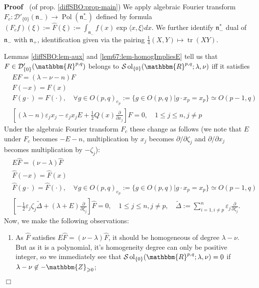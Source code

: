 \documentclass{article}
\newcommand{\assign}{:=}
\newcommand{\nin}{\not\in}
\newcommand{\nocomma}{}
\newcommand{\tmop}[1]{\ensuremath{\operatorname{#1}}}
\renewenvironment{proof}{\noindent\textbf{Proof\ }}{\hspace*{\fill}$\Box$\medskip}
\theoremstyle{remark}
\begin{document}
\begin{proof}
  (of prop. \ref{diffSBO:prop-main}) We apply algebraic Fourier transform $F_c
  : \mathcal{D}'_{\{ 0 \}} (\mathfrak{n}_-) \rightarrow \tmop{Pol}
  (\mathfrak{n}_-^{\ast})^{}$ defined by formula $(F_c f) (\xi) \assign
  \hat{F} (\xi) \assign \int_{\mathfrak{n}_-}^{} f (x) \exp \langle x, \xi
  \rangle d x$. We further identify $\mathfrak{n}_-^{\ast}$ dual of
  $\mathfrak{n}_-$ with $\mathfrak{n}_+$, identification given via the pairing
  $\frac{1}{4} (X, Y) \mapsto \tmop{tr} (X Y)$.
  
  Lemmas \ref{diffSBO:lem-aux} and \ref{lem67:lem-homogImpliesE} tell us that
  $F \in \mathcal{D}'_{\{ 0 \}} (\mathbbm{R}^{p, q})$ belongs to $\mathcal{S}
  \tmop{ol}_{\{ 0 \}} (\mathbbm{R}^{p, q} ; \lambda, \nu)$ iff it satisfies
  \begin{eqnarray}
    & E F = (\lambda - \nu - n) F &  \nonumber\\
    & F (- x) = F (x) &  \nonumber\\
    & F (g \cdot) = F (\cdot), \quad \forall g \in O (p, q)_{e_p} \assign \{
    g \in O (p, q) | g \cdot x_p = x_p \} \simeq O (p - 1, q) &  \nonumber\\
    & \left[ (\lambda - n) \varepsilon_j x_j - \varepsilon_j x_j E +
    \frac{1}{2} Q (x) \frac{\partial}{\partial x_j} \right] F = 0, \quad 1
    \leqslant j \leqslant n, j \neq p &  \nonumber
  \end{eqnarray}
  Under the algebraic Fourier transform $F_c$ these change as follows (we note
  that $E$ under $F_c$ becomes $- E - n$, multiplication by $x_j$ becomes
  $\partial / \partial \zeta_j$ and $\partial / \partial x_j$ becomes
  multiplication by $- \zeta_j$):
  \begin{eqnarray}
    & E \hat{F} = (\nu - \lambda) \hat{F} &  \nonumber\\
    & \hat{F} (- x) = \hat{F} (x) &  \nonumber\\
    & \hat{F} (g \cdot) = \hat{F} (\cdot), \quad \forall g \in O (p, q)_{e_p}
    \assign \{ g \in O (p, q) | g \cdot x_p = x_p \} \simeq O (p - 1, q) & 
    \nonumber\\
    & \left[ - \frac{1}{2} \varepsilon_j \zeta_j \tilde{\Delta} + (\lambda +
    E) \frac{\partial}{\partial \zeta_j} \right] \hat{F} = 0, \quad 1
    \leqslant j \leqslant n, j \neq p, \quad \tilde{\Delta} \assign \sum_{i =
    1, i \neq p}^n \varepsilon_j \frac{\partial}{\partial \zeta_j} . & 
    \nonumber
  \end{eqnarray}
  Now, we make the following observations:
  \begin{enumerate}
    \item As $\hat{F}$ satisfies $E \hat{F} = (\nu - \lambda) \hat{F}
    \nocomma$, it should be homogeneous of degree $\lambda - \nu$. But as it
    is a polynomial, it's homogeneity degree can only be positive integer, so
    we immediately see that $\mathcal{S} \tmop{ol}_{\{ 0 \}} (\mathbbm{R}^{p,
    q} ; \lambda, \nu) = 0$ if $\lambda - \nu \nin -\mathbbm{Z}_{\geqslant
    0}$;
    

\end{enumerate}
\end{proof}
\end{document}
